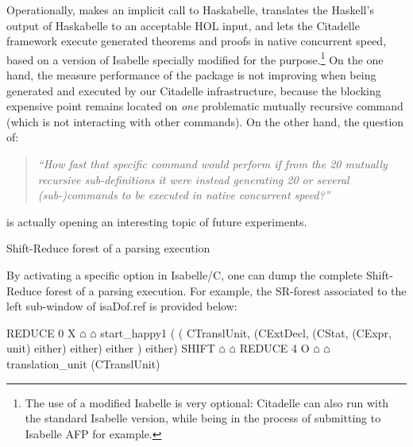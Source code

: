 \begin{isabellebody}
\begin{isamarkuptext}
Operationally,  makes an implicit call to Haskabelle,
translates the Haskell's output of Haskabelle to an acceptable HOL input, and lets the Citadelle
framework execute generated theorems and proofs in native concurrent speed, based on a version of
Isabelle specially modified for the purpose.\footnote{The use of a modified Isabelle is very
  optional: Citadelle can also run with the standard Isabelle version, while being in the process of
  submitting to Isabelle AFP for example.} On the one hand, the measure performance of the
 package is not improving when being generated and executed by
our Citadelle infrastructure, because the blocking expensive point remains located on
\emph{one} problematic mutually recursive 
command (which is not interacting with other commands). On the other hand, the question
of: \begin{quote}\emph{``How fast that specific 
  command would perform if from the 20 mutually recursive sub-definitions it were instead generating
  20 or several (sub-)commands to be executed in native concurrent speed?''}\end{quote} is
  actually opening an interesting topic of future experiments.%
\end{isamarkuptext}\isamarkuptrue%
%
\begin{isamarkupsubsection*}%
[label = {forest},type = {scholarly_paper.technical}, args={label = {forest},type = {scholarly_paper.technical}, scholarly_paper.text_section.main_author = {@{docitem ''fred''}}, Isa_COL.text_element.level = {}, Isa_COL.text_element.referentiable = {False}, Isa_COL.text_element.variants = {{STR ''outline'', STR ''document''}}, scholarly_paper.text_section.fixme_list = {}, Isa_COL.text_element.level = {}, scholarly_paper.technical.definition_list = {}}]Shift-Reduce forest of a parsing execution%
\end{isamarkupsubsection*}\isamarkuptrue%
%
\begin{isamarkuptext}%
By activating a specific option in Isabelle/C, one can dump the complete Shift-Reduce
forest of a parsing execution. For example, the SR-forest associated to the left sub-window of
\csname isaDof.ref is provided below:
\begin{isar}
REDUCE 0 X $\house$ $\house$ start_happy1  ( ( CTranslUnit, (CExtDecl, (CStat, (CExpr, unit) either) either) either )  either) 
 SHIFT $\house$ $\house$ 
 REDUCE 4 O $\house$ $\house$ translation_unit  (CTranslUnit) 

\end{isar}
\end{isamarkuptext}
\end{isabellebody}
